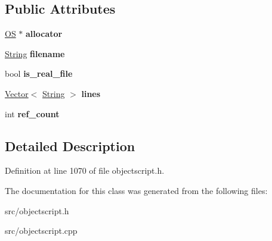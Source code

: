 \subsection*{Public Attributes}
\begin{DoxyCompactItemize}
\item 
\hyperlink{class_object_script_1_1_o_s}{OS} $\ast$ {\bfseries allocator}\hypertarget{class_object_script_1_1_o_s_1_1_core_1_1_tokenizer_1_1_text_data_abc8b26481a5463ee461851d54e916469}{}\label{class_object_script_1_1_o_s_1_1_core_1_1_tokenizer_1_1_text_data_abc8b26481a5463ee461851d54e916469}

\item 
\hyperlink{class_object_script_1_1_o_s_1_1_core_1_1_string}{String} {\bfseries filename}\hypertarget{class_object_script_1_1_o_s_1_1_core_1_1_tokenizer_1_1_text_data_a5696656276147f7a40d0894a0caaf979}{}\label{class_object_script_1_1_o_s_1_1_core_1_1_tokenizer_1_1_text_data_a5696656276147f7a40d0894a0caaf979}

\item 
bool {\bfseries is\+\_\+real\+\_\+file}\hypertarget{class_object_script_1_1_o_s_1_1_core_1_1_tokenizer_1_1_text_data_a7565541d611be47a0beaa0f89b5c01f8}{}\label{class_object_script_1_1_o_s_1_1_core_1_1_tokenizer_1_1_text_data_a7565541d611be47a0beaa0f89b5c01f8}

\item 
\hyperlink{struct_object_script_1_1_o_s_1_1_vector}{Vector}$<$ \hyperlink{class_object_script_1_1_o_s_1_1_core_1_1_string}{String} $>$ {\bfseries lines}\hypertarget{class_object_script_1_1_o_s_1_1_core_1_1_tokenizer_1_1_text_data_a5d4d8d958d678234c09daf48430b6b37}{}\label{class_object_script_1_1_o_s_1_1_core_1_1_tokenizer_1_1_text_data_a5d4d8d958d678234c09daf48430b6b37}

\item 
int {\bfseries ref\+\_\+count}\hypertarget{class_object_script_1_1_o_s_1_1_core_1_1_tokenizer_1_1_text_data_a3b7e914b943effc888223799149bcbe6}{}\label{class_object_script_1_1_o_s_1_1_core_1_1_tokenizer_1_1_text_data_a3b7e914b943effc888223799149bcbe6}

\end{DoxyCompactItemize}


\subsection{Detailed Description}


Definition at line 1070 of file objectscript.\+h.



The documentation for this class was generated from the following files\+:\begin{DoxyCompactItemize}
\item 
src/objectscript.\+h\item 
src/objectscript.\+cpp\end{DoxyCompactItemize}

